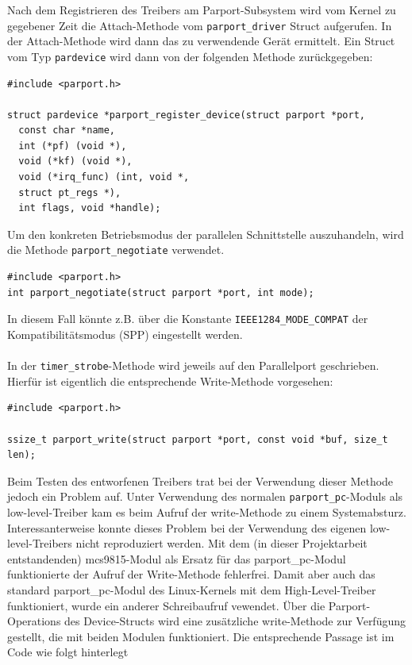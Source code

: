 \documentclass[a4paper,11pt]{article}
\begin{document}
\noindent Nach dem Registrieren des Treibers am Parport-Subsystem wird vom Kernel zu gegebener Zeit die Attach-Methode vom \verb|parport_driver| Struct aufgerufen. In der Attach-Methode wird dann das zu verwendende Gerät ermittelt. Ein Struct vom Typ \verb|pardevice| wird dann von der folgenden Methode zurückgegeben:

\begin{verbatim}
#include <parport.h>

struct pardevice *parport_register_device(struct parport *port, 
  const char *name, 
  int (*pf) (void *), 
  void (*kf) (void *), 
  void (*irq_func) (int, void *, 
  struct pt_regs *), 
  int flags, void *handle);
\end{verbatim}
\noindent
Um den konkreten Betriebsmodus der parallelen Schnittstelle auszuhandeln, wird die Methode \verb|parport_negotiate| verwendet.

\begin{verbatim}
#include <parport.h>
int parport_negotiate(struct parport *port, int mode);
\end{verbatim}
\noindent
In diesem Fall könnte z.B. über die Konstante \verb|IEEE1284_MODE_COMPAT| der Kompatibilitätsmodus (SPP) eingestellt werden. 
\noindent \\\\
In der \verb|timer_strobe|-Methode wird jeweils auf den Parallelport geschrieben. Hierfür ist eigentlich die entsprechende Write-Methode vorgesehen:

\begin{verbatim}
#include <parport.h>

ssize_t parport_write(struct parport *port, const void *buf, size_t len);
\end{verbatim}
\noindent
Beim Testen des entworfenen Treibers trat bei der Verwendung dieser Methode jedoch ein Problem auf. Unter Verwendung des normalen \verb|parport_pc|-Moduls als low-level-Treiber kam es beim Aufruf der write-Methode zu einem Systemabsturz. Interessanterweise konnte dieses Problem bei der Verwendung des eigenen low-level-Treibers nicht reproduziert werden. Mit dem (in dieser Projektarbeit entstandenden) mcs9815-Modul als Ersatz für das parport\_pc-Modul funktionierte der Aufruf der Write-Methode fehlerfrei. Damit aber auch das standard parport\_pc-Modul des Linux-Kernels mit dem High-Level-Treiber funktioniert, wurde ein anderer Schreibaufruf vewendet. Über die Parport-Operations des Device-Structs wird eine zusätzliche write-Methode zur Verfügung gestellt, die mit beiden Modulen funktioniert. Die entsprechende Passage ist im Code wie folgt hinterlegt
\end{document}
